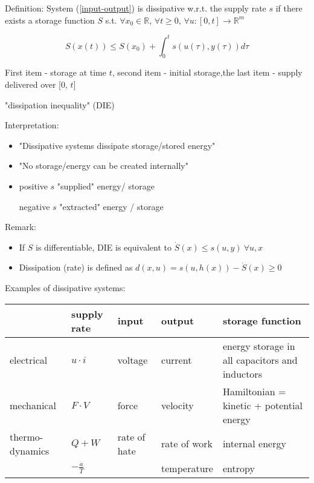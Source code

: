 Definition: System (\ref{input-output}) is dissipative w.r.t. the supply rate $s$ if there exists a storage function $S$ s.t. $\forall x_0 \in \mathbb{R}$, $\forall t \geq 0$, $\forall u : [0, t] \to \mathbb{R}^m$

\begin{equation*}
S(x(t)) \leq S(x_0)
 + \int_0^ts(u(\tau), y(\tau))d\tau
\end{equation*}  

First item - storage at time $t$, second item - initial storage,the last item - supply delivered over [0, $t$]

"dissipation inequality" (DIE)

Interpretation:
\begin{itemize}
\item "Dissipative systems dissipate storage/stored energy"
\item "No storage/energy can be created internally"
\item positive $s$ "supplied" energy/ storage
     
      negative $s$ "extracted" energy / storage
\end{itemize}

Remark: 
\begin{itemize}
\item If $S$ is differentiable, DIE is equivalent to $\dot{S}(x) \leq s(u,y) \ \forall u, x$
\item Dissipation (rate) is defined as $d(x,u) = s(u,h(x)) - \dot{S}(x) \geq 0$
\end{itemize}

Examples of dissipative systems:
\begin{center}
    \begin{tabular}{| l | l | l | l | l |}
    \hline
     & supply rate & input & output & storage function  \\ \hline
    electrical & $u \cdot i$ & voltage & current & energy storage in all capacitors and inductors\\ \hline
    mechanical & $F \cdot V$ & force & velocity & Hamiltonian = kinetic + potential energy \\ \hline
    thermo-dynamics & $Q + W$ & rate of hate & rate of work & internal energy \\
    \hline
    & $-\frac{a}{T}$ & & temperature & entropy \\
    \hline
    \end{tabular}
\end{center}

